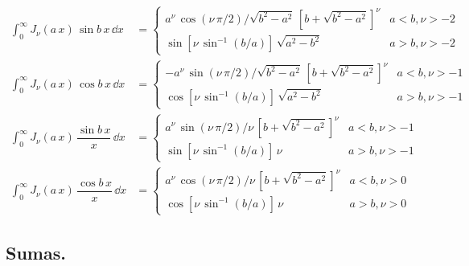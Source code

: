 {\fontsize{12}{12}\selectfont
\begin{align*}
\int_{0}^{\infty} J_{\nu} (a \, x) \, \sin b \, x \, \dd x &=
\begin{cases}
a^{\nu} \, \cos (\nu \, \pi /2)/\sqrt{b^{2} - a^{2}} \, [b + \sqrt{b^{2} - a^{2}}]^{\nu} & a < b,  \nu > -2 \\[0.5em]
\sin [\nu \, \sin^{-1} (b/a)] \, \sqrt{a^{2} - b^{2}} & a > b, \nu > -2 
\end{cases} \\[1em]
\int_{0}^{\infty} J_{\nu} (a \, x) \, \cos b \, x \, \dd x &=
\begin{cases}
-a^{\nu} \, \sin (\nu \, \pi /2)/\sqrt{b^{2} - a^{2}} \, [b + \sqrt{b^{2} - a^{2}}]^{\nu} & a < b,  \nu > -1 \\[0.5em]
\cos [\nu \, \sin^{-1} (b/a)] \, \sqrt{a^{2} - b^{2}} & a > b, \nu > -1 
\end{cases} \\[1em]
\int_{0}^{\infty} J_{\nu} (a \, x) \, \dfrac{\sin b \, x}{x} \, \dd x &=
\begin{cases}
a^{\nu} \, \sin (\nu \, \pi /2)/ \nu \, [b + \sqrt{b^{2} - a^{2}}]^{\nu} & a < b,  \nu > -1 \\[0.5em]
\sin [\nu \, \sin^{-1} (b/a)] \, \nu & a > b, \nu > -1  
\end{cases} \\[1em]
\int_{0}^{\infty} J_{\nu} (a \, x) \, \dfrac{\cos b \, x}{x} \, \dd x &=
\begin{cases}
a^{\nu} \, \cos (\nu \, \pi /2)/ \nu \, [b + \sqrt{b^{2} - a^{2}}]^{\nu} & a < b,  \nu > 0 \\[0.5em]
\cos [\nu \, \sin^{-1} (b/a)] \, \nu & a > b, \nu > 0  
\end{cases}
\end{align*}}

\subsection{Sumas.}

